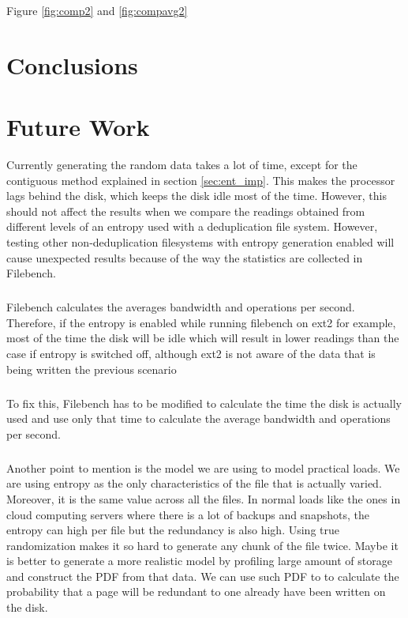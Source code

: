 Figure \ref{fig:comp2} and \ref{fig:compavg2}

\chapter{Conclusions}\label{chap:conc}
\chapter{Future Work}\label{chap:fut}


Currently generating the random data takes a lot of time, except for the contiguous method explained in section \ref{sec:ent_imp}.
This makes the processor lags behind the disk, which keeps the disk idle most of the time.
 However, this should not affect the results when we compare the readings obtained from different levels of an entropy used with a deduplication file system.
 However, testing other non-deduplication filesystems with entropy generation enabled will cause unexpected results because of the way the statistics are collected in Filebench.
\paragraph{}
 Filebench calculates the averages bandwidth and operations per second.
 Therefore, if the entropy is enabled while running filebench on ext2 for example, most of the time the disk will be idle which will result in lower readings than the case if entropy is switched off, although ext2 is not aware of the data that is being written the previous scenario 
\paragraph{}
To fix this, Filebench has to be modified to calculate the time the disk is actually used and use only that time to calculate the average bandwidth and operations per second.
\paragraph{}
Another point to mention is the model we are using to model practical loads. We are using entropy as the only characteristics of the file that is actually varied.
 Moreover, it is the same value across all the files. In normal loads like the ones in cloud computing servers where there is a lot of backups and snapshots, the entropy can high per file but the redundancy is also high.
 Using true randomization makes it so hard to generate any chunk of the file twice.
 Maybe it is better to generate a more realistic model by profiling large amount of storage and construct the PDF from that data. We can use such PDF to to calculate the probability that a page will be redundant to one already have been written on the disk.
